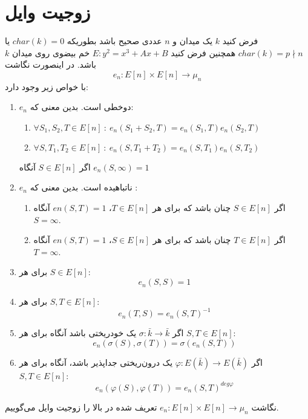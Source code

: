 \section{زوجیت وایل}
فرض کنید 
$k$
یک میدان و 
$n$
عددی صحیح باشد بطوریکه 
$char(k)=0$
یا
$char(k)=p\nmid n$
همچنین فرض کنید
$E:y^2=x^3+Ax+B$
خم بیضوی روی میدان
$k$
باشد. در اینصورت نگاشت
$$ e_n : E[n] \times E[n] \longrightarrow \mu_n $$
با خواص زیر وجود دارد:
\begin{enumerate}
\item{
$e_n$
دوخطی است. بدین معنی که:
\begin{enumerate}
\item{
$\forall S_1,S_2,T \in E[n] ~:~ e_n(S_1+S_2,T)=e_n(S_1,T)e_n(S_2,T)  $
}

\item{
$\forall S,T_1,T_2 \in E[n] ~:~ e_n(S,T_1+T_2)=e_n(S,T_1)e_
n(S,T_2)  $
}
\end{enumerate}

\lemma
اگر
$S \in E[n]$
آنگاه
$e_n(S,\infty)=1$
}
\item{
$e_n$
ناتباهیده است. بدین معنی که :
\begin{enumerate}
\item{
اگر
$S \in E[n]$
چنان باشد که برای هر
$T \in E[n]$،
$en(S,T)=1 $
آنگاه
$ S=\infty$.
}
\item{

اگر
$T \in E[n]$
چنان باشد که برای هر
$S \in E[n]$،
$en(S,T)=1 $
آنگاه
$ T=\infty$.
}
\end{enumerate}
}

\item{
برای هر
$S \in E[n]$:
$$ e_n(S,S)=1 $$
}

\item{
برای هر
$S,T \in E[n]$:
$$ e_n(T,S)=e_n(S,T)^{-1} $$
}

\item{
اگر
$\sigma : \bar{k} \rightarrow \bar{k}$
یک خودریختی باشد آنگاه برای هر
$S,T \in E[n]$:
$$ e_n(\sigma(S), \sigma(T)) = \sigma(e_n(S,T)) $$
}

\item{
اگر
$\varphi : E(\bar{k}) \rightarrow E(\bar{k})$
یک درون‌ریختی جداپذیر باشد، آنگاه برای هر
$S,T \in E[n]$:
$$ e_n(\varphi(S),\varphi(T)) = e_n(S,T)^{deg \varphi}$$
}
\end{enumerate}
نگاشت
$ e_n : E[n] \times E[n] \longrightarrow \mu_n $
تعریف شده در بالا را زوجیت وایل می‌گوییم.
\pagebreak
